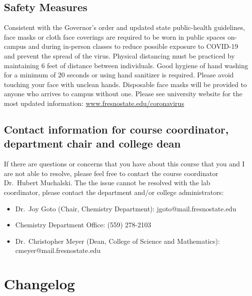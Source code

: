 \hypertarget{safety-measures}{%
\subsection{Safety Measures}\label{safety-measures}}

Consistent with the Governor's order and updated state public-health
guidelines, face masks or cloth face coverings are required to be worn
in public spaces on-campus and during in-person classes to reduce
possible exposure to COVID-19 and prevent the spread of the virus.
Physical distancing must be practiced by maintaining 6 feet of distance
between individuals. Good hygiene of hand washing for a minimum of 20
seconds or using hand sanitizer is required. Please avoid touching your
face with unclean hands. Disposable face masks will be provided to
anyone who arrives to campus without one. Please see university website
for the most updated information:
\href{http://www.fresnostate.edu/president/coronavirus/index.html}{www.fresnostate.edu/coronavirus}

\hypertarget{contact-information-for-course-coordinator-department-chair-and-college-dean}{%
\subsection{Contact information for course coordinator, department chair
and college
dean}\label{contact-information-for-course-coordinator-department-chair-and-college-dean}}

If there are questions or concerns that you have about this course that
you and I are not able to resolve, please feel free to contact the
course coordinator Dr.~Hubert Muchalski. The the issue cannot be
resolved with the lab coordinator, please contact the department and/or
college administrators:

\begin{itemize}
\tightlist
\item
  Dr.~Joy Goto (Chair, Chemistry Department): jgoto@mail.fresnostate.edu
\item
  Chemistry Department Office: (559) 278-2103
\item
  Dr.~Christopher Meyer (Dean, College of Science and Mathematics):
  cmeyer@mail.fresnostate.edu
\end{itemize}

\hypertarget{changelog}{%
\section{Changelog}\label{changelog}}

